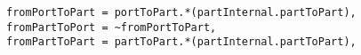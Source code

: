 \lstset{frame=tb, aboveskip=12pt, belowskip=-3pt, breaklines=true, basicstyle=\small\ttfamily, tabsize=2, mathescape=true}
\begin{lstlisting}[caption={bb\_port\_inference.als, lines 62-64}, label=alloy:portnavigation, captionpos=b]
fromPortToPart = portToPart.*(partInternal.partToPart),
fromPartToPort = ~fromPortToPart,
fromPartToPart = partToPart.*(partInternal.partToPart),
\end{lstlisting}
